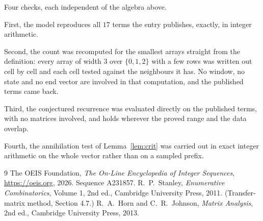 \documentclass[11pt,a4paper]{article}
\theoremstyle{plain}
\theoremstyle{definition}
\begin{document}
Four checks, each independent of the algebra above.

First, the model reproduces all $17$ terms the entry publishes, exactly, in integer
arithmetic.

Second, the count was recomputed for the smallest arrays straight from the definition: every
array of width $3$ over $\{0,1,2\}$ with a few rows was written out cell by cell and each cell
tested against the neighbours it has. No window, no state and no end vector are involved in that
computation, and the published terms came back.

Third, the conjectured recurrence was evaluated directly on the published terms, with no
matrices involved, and holds wherever the proved range and the data overlap.

Fourth, the annihilation test of Lemma~\ref{lem:crit} was carried out in exact integer
arithmetic on the whole vector rather than on a sampled prefix.

\begin{thebibliography}{9}
 The OEIS Foundation, \emph{The On-Line Encyclopedia of Integer
Sequences}, \url{https://oeis.org}, 2026. Sequence A231857.
 R.~P.~Stanley, \emph{Enumerative Combinatorics}, Volume 1, 2nd ed.,
Cambridge University Press, 2011. (Transfer-matrix method, Section 4.7.)
 R.~A.~Horn and C.~R.~Johnson, \emph{Matrix Analysis}, 2nd ed., Cambridge
University Press, 2013.
\end{thebibliography}
\end{document}
